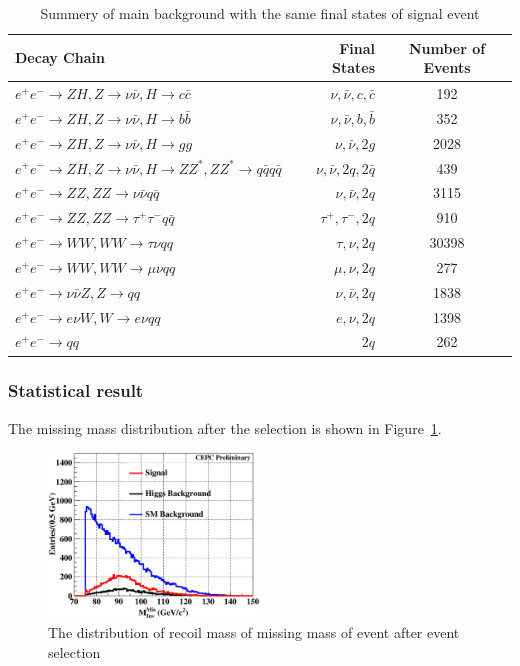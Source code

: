 \documentclass[11pt,a4paper]{cepcnote}
\begin{document}
\begin{table}[H]
\begin{center}
\begin{tabular}{lrc}
\hline\hline
Decay Chain	& Final States 	&	Number of Events\\
\hline
$e^+e^-\rightarrow ZH, Z\rightarrow \nu\bar{\nu}, H\rightarrow c\bar{c}$ & $\nu, \bar{\nu}, c, \bar{c}$			&192	\\
$e^+e^-\rightarrow ZH, Z\rightarrow \nu\bar{\nu}, H\rightarrow b\bar{b}$ & $\nu, \bar{\nu}, b, \bar{b}$			&352	\\
$e^+e^-\rightarrow ZH, Z\rightarrow \nu\bar{\nu}, H\rightarrow gg$ 		 & $\nu, \bar{\nu}, 2g		  $			&2028	\\
$e^+e^-\rightarrow ZH, Z\rightarrow \nu\bar{\nu}, H\rightarrow ZZ^*, ZZ^*\rightarrow q\bar{q}q\bar{q}$ &
																$\nu, \bar{\nu}, 2q, 2\bar{q}$&		439\\	
$e^+e^-\rightarrow ZZ, ZZ\rightarrow \nu\bar{\nu}q\bar{q}$      & $\nu, \bar{\nu}, 2q$					&3115	\\
$e^+e^-\rightarrow ZZ, ZZ\rightarrow \tau^+\tau^-q\bar{q}$ 		& $\tau^+, \tau^-, 2q$					&910	\\
$e^+e^-\rightarrow WW, WW\rightarrow \tau\nu qq$     		   	& $\tau, \nu, 2q$						&	30398\\
$e^+e^-\rightarrow WW, WW\rightarrow \mu\nu qq$        			& $\mu, \nu, 2q$						&	277\\
$e^+e^-\rightarrow \nu\bar{\nu} Z, Z\rightarrow qq$ 			& $\nu, \bar{\nu}, 2q$					&	1838\\
$e^+e^-\rightarrow e\nu W, W\rightarrow e\nu qq$        		& $e, \nu, 2q$							&	1398\\
$e^+e^-\rightarrow qq$											& $2q$											&262 \\
\hline\hline
\end{tabular}
\caption{Summery of main background with the same final states of signal event}
\label{tab:nnqqqqbkg}
\end{center}
\end{table}

\subsubsection{Statistical result}
The missing mass distribution after the selection is shown in
 Figure~\ref{fig:nnhqqqqmismass}.
\begin{figure}[H]
\centering
\includegraphics[width=0.5\textwidth]{nnH/fourq/MisMass_AF}
\caption[]{The distribution of recoil mass of missing mass of event after event selection}
\label{fig:nnhqqqqmismass}
\end{figure}
\end{document}
